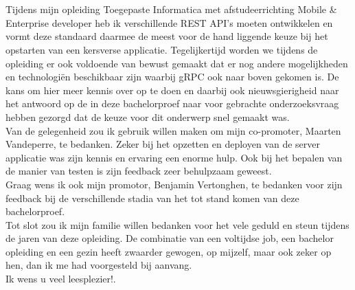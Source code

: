 
\chapter*{}%
\label{ch:voorwoord}

Tijdens mijn opleiding Toegepaste Informatica met afstudeerrichting Mobile \& Enterprise developer heb ik verschillende REST API's moeten ontwikkelen
en vormt deze standaard daarmee de meest voor de hand liggende keuze bij het opstarten van een kersverse applicatie. Tegelijkertijd worden we tijdens
de opleiding er ook voldoende van bewust gemaakt dat er nog andere mogelijkheden en technologi\"en beschikbaar zijn waarbij gRPC ook naar boven gekomen is.
De kans om hier meer kennis over op te doen en daarbij ook nieuwsgierigheid naar het antwoord op de in deze bachelorproef naar voor gebrachte onderzoeksvraag
hebben gezorgd dat de keuze voor dit onderwerp snel gemaakt was.\\

Van de gelegenheid zou ik gebruik willen maken om mijn co-promoter, Maarten Vandeperre, te bedanken. Zeker bij het opzetten en deployen van de server applicatie was
zijn kennis en ervaring een enorme hulp. Ook bij het bepalen van de manier van testen is zijn feedback zeer behulpzaam geweest.\\

Graag wens ik ook mijn promotor, Benjamin Vertonghen, te bedanken voor zijn feedback bij de verschillende stadia van het tot stand komen van deze bachelorproef.\\

Tot slot zou ik mijn familie willen bedanken voor het vele geduld en steun tijdens de jaren van deze opleiding. De combinatie van een voltijdse job, een bachelor opleiding en
een gezin heeft zwaarder gewogen, op mijzelf, maar ook zeker op hen, dan ik me had voorgesteld bij aanvang.\\

Ik wens u veel leesplezier!.